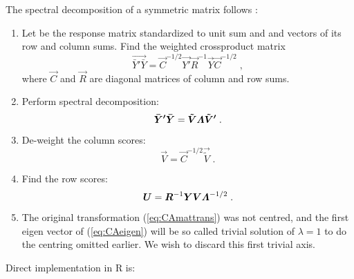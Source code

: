 The spectral decomposition of a symmetric matrix follows
\citet{Nish80}:
\begin{enumerate}
\item Let  be the response matrix standardized to unit sum and
   and  vectors of its row and column sums. Find the
  weighted crossproduct matrix
  \begin{equation}
    \label{eq:CAmattrans}
    \vec{\bar Y' \bar Y} = \vec{C}^{-1/2} \vec{Y'} \vec{R}^{-1} \vec{Y} \vec{C}^{-1/2} \;,
  \end{equation}
  where $\vec{C}$ and $\vec{R}$ are diagonal matrices of column
  and row sums.
\item Perform spectral decomposition:
  \begin{equation}
    \label{eq:CAeigen}
    \vec{\bar Y' \bar Y} = \vec{\tilde V \bLambda \tilde V'} \;.
  \end{equation}
\item De-weight the column scores:
  \begin{equation}
    \vec{V} = \vec{C}^{-1/2} \vec{\tilde{V}} \;.
  \end{equation}
\item Find the row scores:
  \begin{equation}
    \vec{U} = \vec{R}^{-1} \vec{ Y V} \vec{\bLambda}^{-1/2} \;.
  \end{equation}
\item The original transformation (\ref{eq:CAmattrans}) was not
  centred, and the first eigen vector of (\ref{eq:CAeigen}) will be
  so called trivial solution of $\lambda=1$ to do the centring omitted
  earlier. We wish to discard this first trivial axis.
\end{enumerate}
Direct implementation in R is:
\begin{Schunk}
\end{Schunk}

